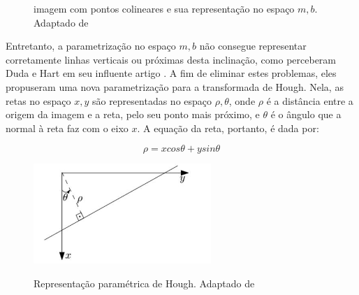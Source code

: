 \begin{figure}[h]
  \centering
  \hfill
  \caption{imagem com pontos colineares e sua representação no espaço $m,b$. Adaptado de \cite{houghintro01}}
  \label{houghpuro}
\end{figure}

Entretanto, a parametrização no espaço $m,b$ não consegue representar corretamente linhas verticais ou próximas desta inclinação, como perceberam Duda e Hart em seu influente artigo \cite{houghintro02}. A fim de eliminar estes problemas, eles propuseram uma nova parametrização para a transformada de Hough. Nela, as retas no espaço $x,y$ são representadas no espaço $\rho,\theta$, onde $\rho$ é a distância entre a origem da imagem e a reta, pelo seu ponto mais próximo, e $\theta$ é o ângulo que a normal à reta faz com o eixo $x$. A equação da reta, portanto, é dada por: 

$$\rho = x cos \theta +y sin \theta $$ 



\begin{figure} [h]
\centering
\includegraphics[width = 0.6\textwidth]{figuras/hough.jpg} \label{hough} \caption{Representação paramétrica de Hough. Adaptado de \cite{hough00}}
\end{figure} 

